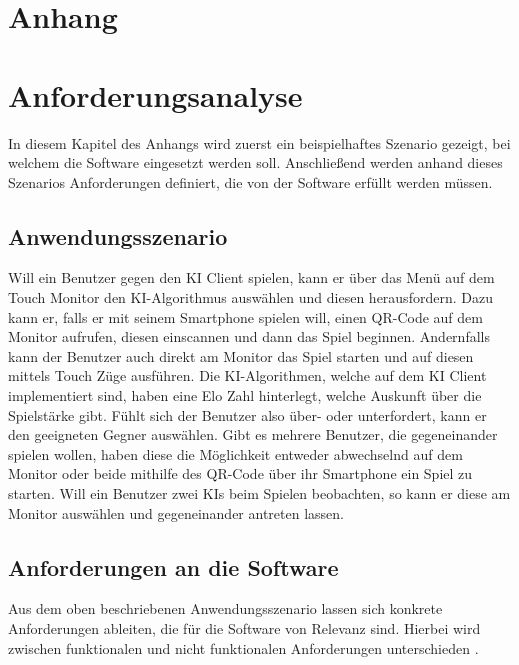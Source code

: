 \documentclass[12pt,a4paper,bibliography=totocnumbered,listof=totocnumbered]{article}
\begin{document}
\begin{appendix}
\section*{Anhang}
{}

\section{Anforderungsanalyse}
\label{apx:Anforderungsanalyse}
In diesem Kapitel des Anhangs wird zuerst ein beispielhaftes Szenario gezeigt, bei welchem die Software eingesetzt werden soll.
Anschließend werden anhand dieses Szenarios Anforderungen definiert, die von der Software erfüllt werden müssen.
\subsection{Anwendungsszenario}
Will ein Benutzer gegen den \ac{KI} Client spielen, kann er über das Menü auf dem Touch Monitor den \ac{KI}-Algorithmus auswählen und diesen herausfordern.
Dazu kann er, falls er mit seinem Smartphone spielen will, einen QR-Code auf dem Monitor aufrufen, diesen einscannen und dann das Spiel beginnen.
Andernfalls kann der Benutzer auch direkt am Monitor das Spiel starten und auf diesen mittels Touch Züge ausführen.
Die \ac{KI}-Algorithmen, welche auf dem \ac{KI} Client implementiert sind, haben eine Elo Zahl hinterlegt, welche Auskunft über die Spielstärke gibt.
Fühlt sich der Benutzer also über- oder unterfordert, kann er den geeigneten Gegner auswählen. Gibt es mehrere Benutzer, die 
gegeneinander spielen wollen, haben diese die Möglichkeit entweder abwechselnd auf dem Monitor oder beide mithilfe des QR-Code über ihr Smartphone ein Spiel zu starten.
Will ein Benutzer zwei \ac{KI}s beim Spielen beobachten, so kann er diese am Monitor auswählen und gegeneinander antreten lassen.
\subsection{Anforderungen an die Software}
Aus dem oben beschriebenen Anwendungsszenario lassen sich konkrete Anforderungen ableiten, die für die Software von Relevanz sind.
Hierbei wird zwischen funktionalen und nicht funktionalen Anforderungen unterschieden \cite{RequirementEngenieering}.

\end{appendix}
\end{document}
